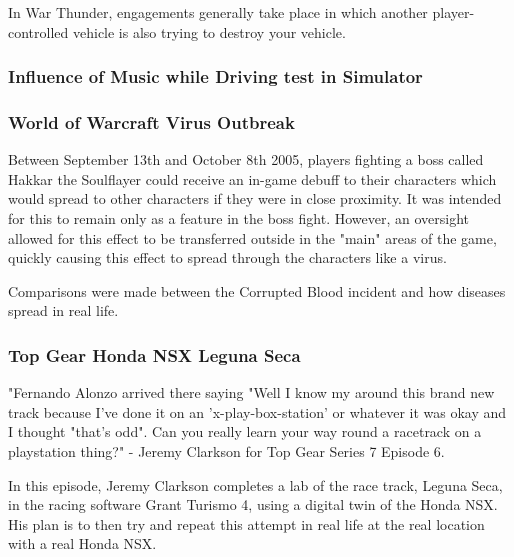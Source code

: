 \documentclass{article}
\begin{document}
In War Thunder, engagements generally take place in which another player-controlled vehicle is also trying to destroy your vehicle.



\subsubsection{Influence of Music while Driving test in Simulator}


\subsubsection{World of Warcraft Virus Outbreak}

Between September 13th and October 8th 2005, players fighting a boss called Hakkar the Soulflayer could receive an in-game debuff to their characters which would spread to other characters if they were in close proximity. It was intended for this to remain only as a feature in the boss fight. However, an oversight allowed for this effect to be transferred outside in the "main" areas of the game, quickly causing this effect to spread through the characters like a virus. 


Comparisons were made between the Corrupted Blood incident and how diseases spread in real life.

\subsubsection{Top Gear Honda NSX Leguna Seca}

"Fernando Alonzo arrived there saying "Well I know my around this brand new track because I've done it on an 'x-play-box-station' or whatever it was okay and I thought "that's odd". Can you really learn your way round a racetrack on a playstation thing?" - Jeremy Clarkson for Top Gear Series 7 Episode 6.

In this episode, Jeremy Clarkson completes a lab of the race track, Leguna Seca, in the racing software Grant Turismo 4, using a digital twin of the Honda NSX. His plan is to then try and repeat this attempt in real life at the real location with a real Honda NSX.
\end{document}
